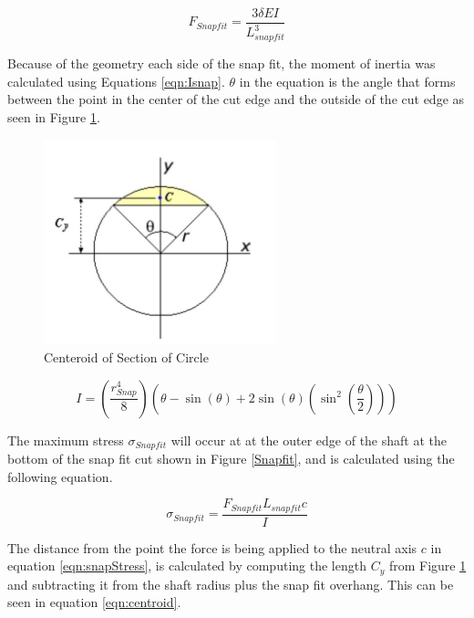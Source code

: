 \documentclass[../main.tex]{subfiles}
\begin{document}
\begin{equation}
\label{eqn:Fsnap}
F_{Snapfit} = \frac{3 \delta E I}{L_{snapfit}^3}
\end{equation}

Because of the geometry each side of the snap fit, the moment of inertia was calculated using Equations \ref{eqn:Isnap}. $\theta$ in the equation is the angle that forms between the point in the center of the cut edge and the outside of the cut edge as seen in Figure \ref{fig:circleSection}.
\begin{figure}[H]
	\centering
	\includegraphics[width=0.6\textwidth]{img/Gondola/circleSectionGeometry.jpg}
	\caption{Centeroid of Section of Circle \cite{circlesection}}
	\label{fig:circleSection}
\end{figure}

\begin{equation}
\label{eqn:Isnap}
I = \left(\frac{r_{Snap}^4}{8}\right)  \left(\theta -\sin(\theta)+2\sin(\theta)(\sin^2\left(\frac{\theta}{2}\right))\right)
\end{equation}

The maximum stress $\sigma_{Snapfit}$ will occur at at the outer edge of the shaft at the bottom of the snap fit cut shown in Figure \ref{Snapfit}, and is calculated using the following equation.

\begin{equation}
\label{eqn:snapStress}
\sigma_{Snapfit} = \frac{F_{Snapfit} L_{snapfit} c}{I}
\end{equation}

The distance from the point the force is being applied to the neutral axis $c$ in equation \ref{eqn:snapStress}, is calculated by computing the length $C_y$ from Figure \ref{fig:circleSection} and subtracting it from the shaft radius plus the snap fit overhang. This can be seen in equation \ref{eqn:centroid}. 
\end{document}
